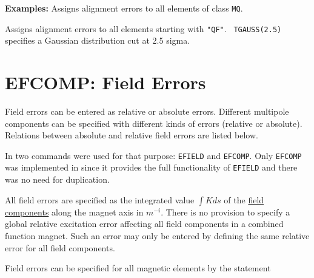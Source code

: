 {\bf Examples:}
Assigns alignment errors to all elements of class {\tt MQ}.



Assigns alignment errors to all elements starting with {\tt "QF"}. {\tt 
TGAUSS(2.5)} specifies a Gaussian distribution cut at 2.5 sigma.





%

\section{EFCOMP: Field Errors}
\label{sec:efcomp}
Field errors can be entered as relative or absolute errors. Different
multipole components can be specified with different kinds of errors
(relative or absolute). Relations between absolute and relative field
errors are listed below.  

In \madeight two commands were used for that purpose: {\tt EFIELD} 
and {\tt EFCOMP}.
Only {\tt EFCOMP} was implemented in \madx since it provides the full 
functionality
of {\tt EFIELD} and there was no need for duplication.  

All field errors are specified as the integrated value $\int K ds$ 
of the \hyperref[sec:sign_convention]{field components} along the magnet axis 
in $m^{-i}$. There is no provision
to specify a global relative excitation error affecting all field
components in a combined function magnet. Such an error may only be
entered by defining the same relative error for all field components.  

Field errors can be specified for all magnetic elements by the statement  


